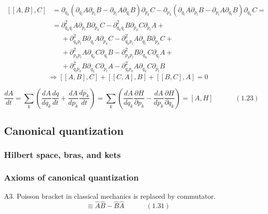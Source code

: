 \documentclass[twoside]{amsart}
\begin{document}
\[
\begin{aligned}
  [[A,B],C] & = \partial_{q_k} ( \partial_{q_l} A \partial_{p_l} B - \partial_{p_l} A \partial_{q_l} B ) \partial_{p_k} C - \partial_{p_k} ( \partial_{q_l} A \partial_{p_l} B - \partial_{p_l} A \partial_{q_l} B ) \partial_{q_k} C =  \\ 
  & = \partial^2_{q_k q_l} A \partial_{p_l} B \partial_{p_k} C - \partial^2_{q_k q_l} B \partial_{p_k} C \partial_{p_l} A + \\
  & \phantom{ = } + \partial^2_{q_k p_l} B \partial_{q_l} A \partial_{p_k} C - \partial^2_{q_k p_l} A \partial_{q_l} B \partial_{p_k} C + \\
  & \phantom{ = } + \partial^2_{p_k p_l} A \partial_{q_k} C \partial_{q_l} B - \partial^2_{p_k p_l } B \partial_{q_k} C \partial_{q_l} A + \\ 
  & \phantom{ = } + \partial^2_{q_l p_k} B \partial_{q_k} C \partial_{p_l}A - \partial^2_{q_l p_k} A \partial_{q_k} C \partial_{p_l} B
\end{aligned}
\]
\[
\Longrightarrow [[A,B], C ] + [[C,A], B] + [[B,C], A] = 0
\]

\begin{equation}
  \frac{dA}{dt} = \sum_k \left( \frac{ dA}{ dq_k } \frac{ dq}{ dt} + \frac{dA}{ dp_k } \frac{dp_k}{dt} \right) = \sum_k \left( \frac{dA}{ dq_k} \frac{ \partial H}{ \partial p_k} - \frac{ dA}{ d p_k} \frac{ \partial H}{ \partial q_k} \right) = [A,H] \quad \quad \quad \, (1.23)
\end{equation}


\subsection{ Canonical quantization }
\subsubsection{Hilbert space, bras, and kets}
\subsubsection{Axioms of canonical quantization}

A3. Poisson bracket in classical mechanics is replaced by commutator. 
\begin{equation}
  [ \widehat{A}, \widehat{B} ] \equiv \widehat{A} \widehat{B} - \widehat{B} \widehat{A} \quad \quad \quad \, (1.31)
\end{equation}
\end{document}
